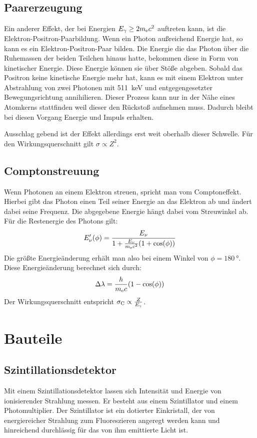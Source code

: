 \documentclass[11pt, ngerman, fleqn, DIV=15, headinclude, BCOR=2cm]{scrreprt}
\begin{document}
\subsection{Paarerzeugung}

Ein anderer Effekt, der bei Energien $E_\gamma \ge 2m_\text ec^2$ auftreten
kann, ist die Elektron-Positron-Paarbildung. Wenn ein Photon außreichend
Energie hat, so kann es ein Elektron-Positron-Paar bilden. Die Energie die das
Photon über die Ruhemassen der beiden Teilchen hinaus hatte, bekommen diese in
Form von kinetischer Energie. Diese Energie können sie über Stöße abgeben.
Sobald das Positron keine kinetische Energie mehr hat, kann es mit einem
Elektron unter Abstrahlung von zwei Photonen mit \SI{511}{\kilo\electronvolt}
und entgegengesetzter Bewegungsrichtung annihilieren. Dieser Prozess kann nur in der Nähe eines Atomkerns stattfinden weil dieser
den Rückstoß aufnehmen muss.
Dadurch bleibt bei diesen Vorgang Energie und Impuls erhalten.

Ausschlag gebend ist der Effekt allerdings erst weit oberhalb dieser Schwelle.
Für den Wirkungsquerschnitt gilt $\sigma \propto Z^2$.

\subsection{Comptonstreuung}
Wenn Photonen an einem Elektron streuen, spricht man vom Comptoneffekt. 
Hierbei gibt das Photon einen Teil seiner Energie an das Elektron ab und ändert dabei
seine Frequenz.%
Die abgegebene Energie hängt dabei vom Streuwinkel ab.
Für die Restenergie des Photons gilt:
\[
    E_\nu'(\phi) = \frac{E_\nu}{1+\frac{E_\nu}{m_\text ec^2}(1+\cos(\phi))}
\]
Die größte Energieänderung erhält man also bei einem Winkel von
$\phi=\SI{180}{\degree}$.
Diese Energieänderung berechnet sich durch:
\[
    \Delta\lambda = \frac{h}{m_\text ec}(1-\cos(\phi))
\]
Der Wirkungsquerschnitt entspricht $\sigma_\text C \propto \frac{Z}{E_\gamma}$.

\section{Bauteile}
\subsection{Szintillationsdetektor}

Mit einem Szintillationsdetektor lassen sich Intensität und Energie von
ionisierender Strahlung messen.
Er besteht aus einem Szintillator und einem Photomultiplier.
Der Szintillator ist ein dotierter Einkristall, der von energiereicher
Strahlung zum Fluoreszieren angeregt werden kann und hinreichend
durchlässig für das von ihm emittierte Licht ist.
\end{document}
